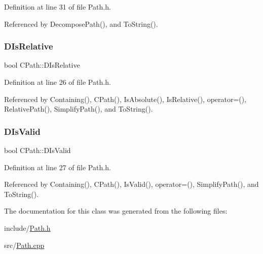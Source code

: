 Definition at line 31 of file Path.\+h.



Referenced by Decompose\+Path(), and To\+String().

\hypertarget{classCPath_af705ff149bb2281c67afb84fff550eb9}{}\label{classCPath_af705ff149bb2281c67afb84fff550eb9} 
\subsubsection{\texorpdfstring{D\+Is\+Relative}{DIsRelative}}
{\footnotesize\ttfamily bool C\+Path\+::\+D\+Is\+Relative\hspace{0.3cm}{\ttfamily [protected]}}



Definition at line 26 of file Path.\+h.



Referenced by Containing(), C\+Path(), Is\+Absolute(), Is\+Relative(), operator=(), Relative\+Path(), Simplify\+Path(), and To\+String().

\hypertarget{classCPath_a992aca27a1cba1c3bae3d04438821192}{}\label{classCPath_a992aca27a1cba1c3bae3d04438821192} 
\subsubsection{\texorpdfstring{D\+Is\+Valid}{DIsValid}}
{\footnotesize\ttfamily bool C\+Path\+::\+D\+Is\+Valid\hspace{0.3cm}{\ttfamily [protected]}}



Definition at line 27 of file Path.\+h.



Referenced by Containing(), C\+Path(), Is\+Valid(), operator=(), Simplify\+Path(), and To\+String().



The documentation for this class was generated from the following files\+:\begin{DoxyCompactItemize}
\item 
include/\hyperlink{Path_8h}{Path.\+h}\item 
src/\hyperlink{Path_8cpp}{Path.\+cpp}\end{DoxyCompactItemize}
